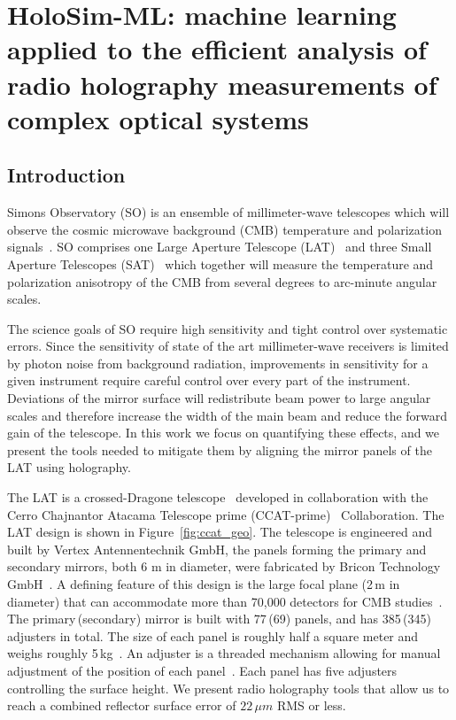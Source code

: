 \chapter{HoloSim-ML: machine learning applied to the efficient analysis of radio holography measurements of complex optical systems}
\label{ch:holosim}
\section{Introduction}
Simons Observatory (SO) is an ensemble of millimeter-wave telescopes which will observe the cosmic microwave background (CMB) temperature and polarization signals~\cite{gali18, so19}. SO comprises one Large Aperture Telescope (LAT)~\cite{Niemack:16, Gudmundsson:21,Parshley_2018} and three Small Aperture Telescopes (SAT)~\cite{ali20} which together will measure the temperature and polarization anisotropy of the CMB from several degrees to arc-minute angular scales.

The science goals of SO require high sensitivity and tight control over systematic errors.  Since the sensitivity of state of the art millimeter-wave receivers is limited by photon noise from background radiation, improvements in sensitivity for a given instrument require careful control over every part of the instrument.  Deviations of the mirror surface will redistribute beam power to large angular scales and therefore increase the width of the main beam and reduce the forward gain of the telescope.  In this work we focus on quantifying these effects, and we present the tools needed to mitigate them by aligning the mirror panels of the LAT using holography.

The LAT is a crossed-Dragone telescope~\cite{6773968,Gudmundsson:21,Niemack:16,2021RNAAS...5..100X} developed in collaboration with the Cerro Chajnantor Atacama Telescope prime (CCAT-prime)~\cite{ccat,aravena2019ccatprime} Collaboration.  The LAT design is shown in Figure~\ref{fig:ccat_geo}.  The telescope is engineered and built by Vertex Antennentechnik GmbH, the panels forming the primary and secondary mirrors, both 6 m in diameter, were fabricated by Bricon Technology GmbH~\cite{vertex}.  A defining feature of this design is the large focal plane (2\,m in diameter) that can accommodate more than 70,000 detectors for CMB studies~\cite{Parshley_2018,zhu2021simons,mccarrick2021simons}. The primary\,(secondary) mirror is built with 77\,(69) panels, and has 385\,(345) adjusters in total.  The size of each panel is roughly half a square meter and weighs roughly 5\,kg~\cite{ccat}.  An adjuster is a threaded mechanism allowing for manual adjustment of the position of each panel~\cite{Woody}.  Each panel has five adjusters controlling the surface height.  We present radio holography tools that allow us to reach a combined reflector surface error of $22\,\mu m$ RMS or less.

